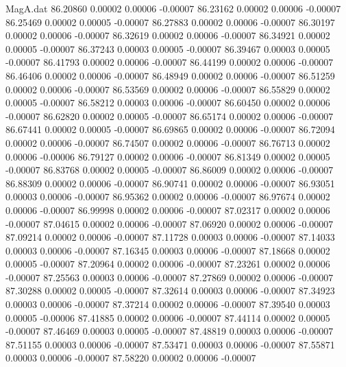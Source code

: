 \begin{filecontents}{MagA.dat}
  86.20860    0.00002    0.00006   -0.00007
  86.23162    0.00002    0.00006   -0.00007
  86.25469    0.00002    0.00005   -0.00007
  86.27883    0.00002    0.00006   -0.00007
  86.30197    0.00002    0.00006   -0.00007
  86.32619    0.00002    0.00006   -0.00007
  86.34921    0.00002    0.00005   -0.00007
  86.37243    0.00003    0.00005   -0.00007
  86.39467    0.00003    0.00005   -0.00007
  86.41793    0.00002    0.00006   -0.00007
  86.44199    0.00002    0.00006   -0.00007
  86.46406    0.00002    0.00006   -0.00007
  86.48949    0.00002    0.00006   -0.00007
  86.51259    0.00002    0.00006   -0.00007
  86.53569    0.00002    0.00006   -0.00007
  86.55829    0.00002    0.00005   -0.00007
  86.58212    0.00003    0.00006   -0.00007
  86.60450    0.00002    0.00006   -0.00007
  86.62820    0.00002    0.00005   -0.00007
  86.65174    0.00002    0.00006   -0.00007
  86.67441    0.00002    0.00005   -0.00007
  86.69865    0.00002    0.00006   -0.00007
  86.72094    0.00002    0.00006   -0.00007
  86.74507    0.00002    0.00006   -0.00007
  86.76713    0.00002    0.00006   -0.00006
  86.79127    0.00002    0.00006   -0.00007
  86.81349    0.00002    0.00005   -0.00007
  86.83768    0.00002    0.00005   -0.00007
  86.86009    0.00002    0.00006   -0.00007
  86.88309    0.00002    0.00006   -0.00007
  86.90741    0.00002    0.00006   -0.00007
  86.93051    0.00003    0.00006   -0.00007
  86.95362    0.00002    0.00006   -0.00007
  86.97674    0.00002    0.00006   -0.00007
  86.99998    0.00002    0.00006   -0.00007
  87.02317    0.00002    0.00006   -0.00007
  87.04615    0.00002    0.00006   -0.00007
  87.06920    0.00002    0.00006   -0.00007
  87.09214    0.00002    0.00006   -0.00007
  87.11728    0.00003    0.00006   -0.00007
  87.14033    0.00003    0.00006   -0.00007
  87.16345    0.00003    0.00006   -0.00007
  87.18668    0.00002    0.00005   -0.00007
  87.20964    0.00002    0.00006   -0.00007
  87.23261    0.00002    0.00006   -0.00007
  87.25563    0.00003    0.00006   -0.00007
  87.27869    0.00002    0.00006   -0.00007
  87.30288    0.00002    0.00005   -0.00007
  87.32614    0.00003    0.00006   -0.00007
  87.34923    0.00003    0.00006   -0.00007
  87.37214    0.00002    0.00006   -0.00007
  87.39540    0.00003    0.00005   -0.00006
  87.41885    0.00002    0.00006   -0.00007
  87.44114    0.00002    0.00005   -0.00007
  87.46469    0.00003    0.00005   -0.00007
  87.48819    0.00003    0.00006   -0.00007
  87.51155    0.00003    0.00006   -0.00007
  87.53471    0.00003    0.00006   -0.00007
  87.55871    0.00003    0.00006   -0.00007
  87.58220    0.00002    0.00006   -0.00007

\end{filecontents}
